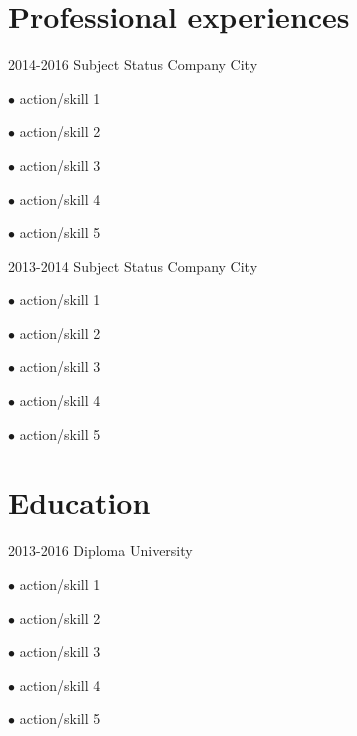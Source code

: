 \documentclass[]{classes/friggeri-resume}
\begin{document}

	\section{\faBriefcase\space Professional experiences}


		\Experience
		{2014-2016}
		{Subject}
		{Status}
		{Company}
		{City}
		{
			$\bullet$ action/skill 1

			$\bullet$ action/skill 2

			$\bullet$ action/skill 3

			$\bullet$ action/skill 4

			$\bullet$ action/skill 5
		}


		\Experience
		{2013-2014}
		{Subject}
		{Status}
		{Company}
		{City}
		{
			$\bullet$ action/skill 1

			$\bullet$ action/skill 2

			$\bullet$ action/skill 3

			$\bullet$ action/skill 4

			$\bullet$ action/skill 5
		}



	\section{\faBook\space Education}


		\Education
		{2013-2016}
		{Diploma}
		{University}
		{
			$\bullet$ action/skill 1

			$\bullet$ action/skill 2

			$\bullet$ action/skill 3

			$\bullet$ action/skill 4

			$\bullet$ action/skill 5
		}
\end{document}
